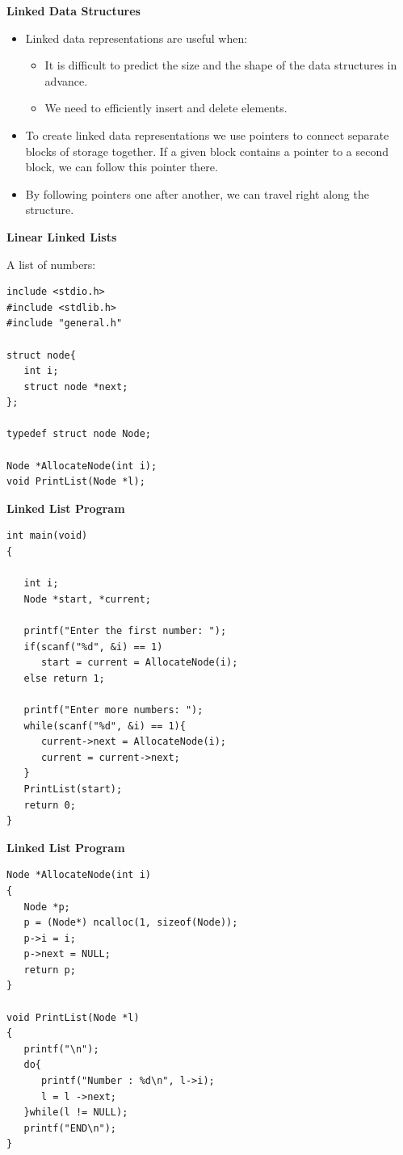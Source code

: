 \documentclass[a4,portraitt]{slides}
\begin{document}
\newpage
{\samepage
\begin{center}
{\Large{\bf Linked Data Structures}}
\end{center}
\begin{itemize}
\item Linked data representations are useful when:
\begin{itemize}
\item It is difficult to predict the size and the shape of the data structures in advance.
\item We need to efficiently insert and delete elements.
\end{itemize}
\item To create linked data representations we use pointers to connect separate blocks of storage together. If a given block contains a pointer to a second block, we can follow this pointer there.
\item By following pointers one after another, we can travel right along the structure.
\end{itemize}
}


\newpage
{\samepage
\begin{center}
{\Large{\bf Linear Linked Lists}}
\end{center}
A list of numbers:

\begin{verbatim}
include <stdio.h>
#include <stdlib.h>
#include "general.h"

struct node{
   int i;
   struct node *next;
};

typedef struct node Node;

Node *AllocateNode(int i);
void PrintList(Node *l);
\end{verbatim}
}

\newpage
{\samepage
\begin{center}
{\Large{\bf Linked List Program}}
\end{center}
\begin{verbatim}
int main(void)
{

   int i;
   Node *start, *current;

   printf("Enter the first number: ");
   if(scanf("%d", &i) == 1)
      start = current = AllocateNode(i);
   else return 1;

   printf("Enter more numbers: ");
   while(scanf("%d", &i) == 1){
      current->next = AllocateNode(i);
      current = current->next;
   }
   PrintList(start);
   return 0;
}
\end{verbatim}
}

\newpage
{\samepage
\begin{center}
{\Large{\bf Linked List Program}}
\end{center}
\begin{verbatim}
Node *AllocateNode(int i)
{
   Node *p;
   p = (Node*) ncalloc(1, sizeof(Node));
   p->i = i;
   p->next = NULL;
   return p;
}

void PrintList(Node *l)
{
   printf("\n");
   do{
      printf("Number : %d\n", l->i);
      l = l ->next;
   }while(l != NULL);
   printf("END\n");
}
\end{verbatim}
}
\end{document}
